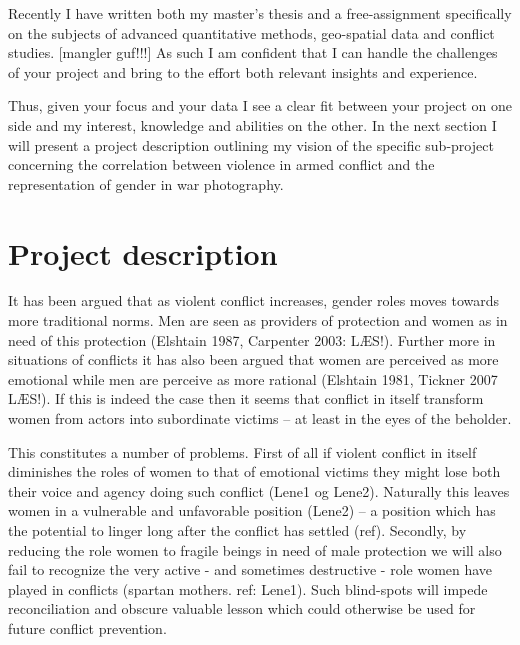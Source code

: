 \documentclass[a4paper]{article}
\begin{document}
Recently I have written both my master's thesis \citep{SPECIALE} and a free-assignment \citep{Maase} specifically on the subjects of advanced quantitative methods, geo-spatial data and conflict studies. [mangler guf!!!] As such I am confident that I can handle the challenges of your project and bring to the effort both relevant insights and experience.\par%

Thus, given your focus and your data I see a clear fit between your project on one side and my interest, knowledge and abilities on the other. In the next section I will present a project description outlining my vision of the specific sub-project concerning the correlation between violence in armed conflict and the representation of gender in war photography.\par


\section{Project description} 

It has been argued that as violent conflict increases, gender roles moves towards more traditional norms. Men are seen as providers of protection and women as in need of this protection (Elshtain 1987, Carpenter 2003: LÆS!). Further more in situations of conflicts it has also been argued that women are perceived as more emotional while men are perceive as more rational (Elshtain 1981, Tickner 2007 LÆS!). If this is indeed the case then it seems that conflict in itself transform women from actors into subordinate victims -- at least in the eyes of the beholder.\par 

This constitutes a number of problems. First of all if violent conflict in itself diminishes the roles of women to that of emotional victims they might lose both their voice and agency doing such conflict (Lene1 og Lene2). Naturally this leaves women in a vulnerable and unfavorable position (Lene2) -- a position which has the potential to linger long after the conflict has settled (ref). Secondly, by reducing the role women to fragile beings in need of male protection we will also fail to recognize the very active - and sometimes destructive - role women have played in conflicts (spartan mothers. ref: Lene1). Such blind-spots will impede reconciliation and obscure valuable lesson which could otherwise be used for future conflict prevention.\par
\end{document}
